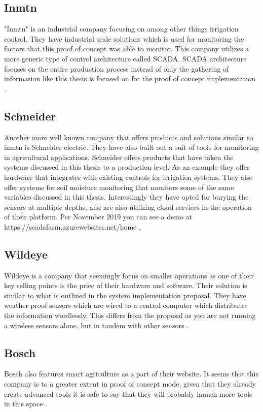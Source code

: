 \documentclass[]{uiophd}
\begin{document}
\subsection{Inmtn}
"Inmtn" is an industrial company focusing on among other things irrigation control. They have industrial scale solutions which is used for monitoring the factors that this proof of concept was able to monitor. This company utilizes a more generic type of control architecture called SCADA.  SCADA architecture focuses on the entire production process instead of only the gathering of information like this thesis is focused on for the proof of concept implementation \cite{Inmntn}.

\subsection{Schneider}
Another more well known company that offers products and solutions similar to inmtn is Schneider electric. They have also built out a suit of tools for monitoring in agricultural applications. Schneider offers products that have taken the systems discussed in this thesis to a production level. As an example they offer hardware that integrates with existing controls for irrigation systems. They also offer systems for soil moisture monitoring that monitors some of the same variables discussed in this thesis. Interestingly they have opted for burying the sensors at multiple depths, and are also utilizing cloud services in the operation of their platform. Per November 2019 you can see a demo at https://scadafarm.azurewebsites.net/home . 

\subsection{Wildeye}
Wildeye is a company that seemingly focus on smaller operations as one of their key selling points is the price of their hardware and software. Their solution is similar to what is outlined in the system implementation proposal. They have weather proof sensors which are wired to a central computer which distributes the information wordlessly. This differs from the proposal as you are not running a wireless sensors alone, but in tandem with other sensors \cite{wildeye}.

\subsection{Bosch}
Bosch also features smart agriculture as a part of their website. It seems that this company is to a greater extent in proof of concept mode, given that they already create advanced tools it is safe to say that they will probably launch more tools in this space \cite{Bosch}.
\end{document}
